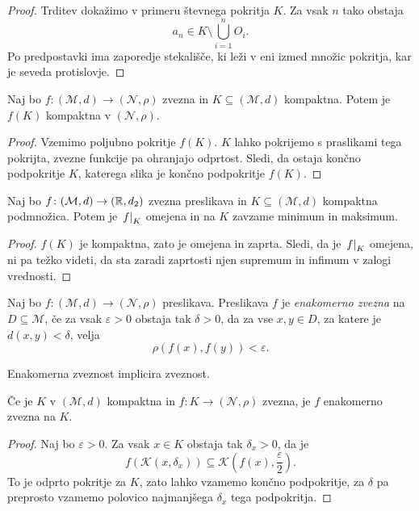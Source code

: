 \documentclass[12pt, a4paper]{article}
\begin{document}
\begin{proof}
Trditev dokažimo v primeru števnega pokritja $K$. Za vsak $n$ tako obstaja
\[
a_n\in K\setminus\bigcup_{i=1}^nO_i.
\]
Po predpostavki ima zaporedje stekališče, ki leži v eni izmed množic pokritja, kar je seveda protislovje.
\end{proof}

\begin{izrek}
Naj bo $f\colon (\mathcal{M},d)\to(\mathcal{N},\rho)$ zvezna in $K\subseteq(\mathcal{M},d)$ kompaktna. Potem je $f(K)$ kompaktna v $(\mathcal{N},\rho)$.
\end{izrek}

\begin{proof}
Vzemimo poljubno pokritje $f(K)$. $K$ lahko pokrijemo s praslikami tega pokrijta, zvezne funkcije pa ohranjajo odprtost. Sledi, da ostaja končno podpokritje $K$, katerega slika je končno podpokritje $f(K)$.
\end{proof}

\begin{posledica}
Naj bo $f\colon (\mathcal{M},d)\to(\mathbb{R},d_2)$ zvezna preslikava in $K\subseteq(\mathcal{M},d)$ kompaktna podmnožica. Potem je $\left. f\right|_{K}^{}$ omejena in na $K$ zavzame minimum in maksimum.
\end{posledica}

\begin{proof}
$f(K)$ je kompaktna, zato je omejena in zaprta. Sledi, da je $\left. f\right|_{K}^{}$ omejena, ni pa težko videti, da sta zaradi zaprtosti njen supremum in infimum v zalogi vrednosti.
\end{proof}

\begin{definicija}
Naj bo $f\colon (\mathcal{M},d)\to(\mathcal{N},\rho)$ preslikava. Preslikava $f$ je \emph{enakomerno zvezna} na $D\subseteq \mathcal{M}$, če za vsak $\varepsilon>0$ obstaja tak $\delta>0$, da za vse $x,y\in D$, za katere je $d(x,y)<\delta$, velja
\[
\rho(f(x),f(y))<\varepsilon.
\]
\end{definicija}

\begin{opomba}
Enakomerna zveznost implicira zveznost.
\end{opomba}

\begin{izrek}
Če je $K$ v $(\mathcal{M},d)$ kompaktna in $f\colon K\to(\mathcal{N},\rho)$ zvezna, je $f$ enakomerno zvezna na $K$.
\end{izrek}

\begin{proof}
Naj bo $\varepsilon>0$. Za vsak $x\in K$ obstaja tak $\delta_x>0$, da je
\[
f(\mathcal{K}(x,\delta_x))\subseteq\mathcal{K}\left(f(x),\frac{\varepsilon}{2}\right).
\]
To je odprto pokritje za $K$, zato lahko vzamemo končno podpokritje, za $\delta$ pa preprosto vzamemo polovico najmanjšega $\delta_x$ tega podpokritja.
\end{proof}

\newpage
\printindex
\end{document}
